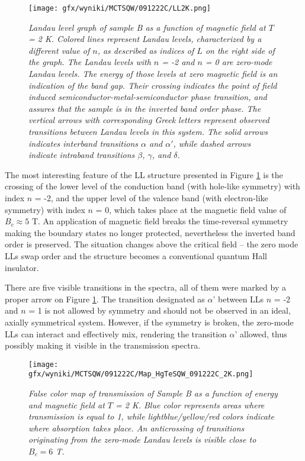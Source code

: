 \documentclass[titlepage,a4paper]{book}
\begin{document}
\begin{figure}[ht]
	\centering
	\texttt{[image: gfx/wyniki/MCTSQW/091222C/LL2K.png]}
	\vspace{-10pt}
	\caption{\textit{Landau level graph of sample B as a function of magnetic field at $T$ = 2 K. Colored lines represent Landau levels, characterized by a different value of $n$, as described as indices of $L$ on the right side of the graph. The Landau levels with $n$ = -2 and $n$ = 0 are zero-mode Landau levels. The energy of those levels at zero magnetic field is an indication of the band gap. Their crossing indicates the point of field induced semiconductor-metal-semiconductor phase transition, and assures that the sample is in the inverted band order phase. The vertical arrows with corresponding Greek letters represent observed transitions between Landau levels in this system. The solid arrows indicates interband transitions $\alpha$ and $\alpha'$, while dashed arrows indicate intraband transitions $\beta$, $\gamma$, and $\delta$.}}
	\label{fig:LL_SQW_2K}
\end{figure}

The most interesting feature of the LL structure presented in Figure \ref{fig:LL_SQW_2K} is the crossing of the lower level of the conduction band (with hole-like symmetry) with index $n$ = -2, and the upper level of the valence band (with electron-like symmetry) with index $n$ = 0, which takes place at the magnetic field value of $B_c \approx 5$ T. An application of magnetic field breaks the time-reversal symmetry making the boundary states no longer protected, nevertheless the inverted band order is preserved. The situation changes above the critical field -- the zero mode LLs swap order and the structure becomes a conventional quantum Hall insulator. 

There are five visible transitions in the spectra, all of them were marked by a proper arrow on Figure \ref{fig:LL_SQW_2K}. The transition designated as $\alpha$' between LLs $n$ = -2 and $n$ = 1 is not allowed by symmetry and should not be observed in an ideal, axially symmetrical system. However, if the symmetry is broken, the zero-mode LLs can interact and effectively mix, rendering the transition $\alpha$' allowed, thus possibly making it visible in the transmission spectra. 

\begin{figure}[ht]
	\centering
	\texttt{[image: gfx/wyniki/MCTSQW/091222C/Map\_HgTeSQW\_091222C\_2K.png]}
	\vspace{-10pt}
	\caption{\textit{False color map of transmission of Sample B as a function of energy and magnetic field at $T$ = 2 K. Blue color represents areas where transmission is equal to 1, while lightblue/yellow/red colors indicate where absorption takes place. An anticrossing of transitions originating from the zero-mode Landau levels is visible close to $B_c = 6$ T. }}
	\label{fig:Map_SQW_2K}
\end{figure}
\end{document}

